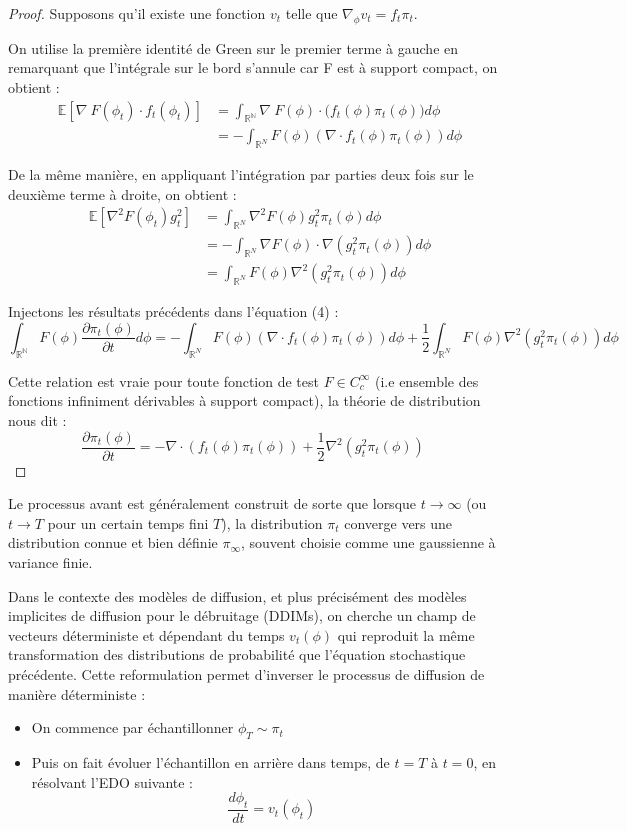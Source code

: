\documentclass[a4paper,10pt]{article}
\theoremstyle{definition} %
\theoremstyle{definition} %
\theoremstyle{definition} %
\theoremstyle{definition} %
\newcommand{\E}[1]{\mathbb{E}\left[#1\right]}
\newcommand{\R}{\mathbb{R}}
\begin{document}
\begin{proof}
Supposons qu'il existe une fonction $v_t$ telle que $\nabla_{\phi} v_t = f_t \pi_t$.

On utilise la première identité de Green sur le premier terme à gauche en remarquant que l'intégrale sur le bord s'annule car F est à support compact, on obtient :
\begin{align*}
    \E{\nabla\ F(\phi_t)\cdot f_t(\phi_t)}  &=\int_{\mathbb{R^N}} \nabla\ F(\phi)\cdot \big(f_t(\phi) \pi_t(\phi) \bigr)d\phi \\
    &= - \int_{\mathbb{R}^N}F(\phi) (\nabla \cdot f_t(\phi)\pi_t(\phi))d\phi
\end{align*}

De la même manière, en appliquant l'intégration par parties deux fois sur le deuxième terme à droite, on obtient :
\begin{align*}
    \E{\nabla^2 F(\phi_t) g_t^2} &= \int_{\mathbb{R}^N } \nabla^2 F(\phi) g_t^2 \pi_t(\phi)d\phi\\
    &= -\int_{\R^N}\nabla F(\phi) \cdot\nabla(g_t^2\pi_t(\phi)) d\phi\\
    &= \int_{\mathbb{R}^N } F(\phi) \nabla^2(g_t^2 \pi_t(\phi)) d\phi
\end{align*}

Injectons les résultats précédents dans l'équation (4) :
\[\int_{\mathbb{R^N}}F(\phi)\frac{\partial\pi_t(\phi)}{\partial t} d\phi = - \int_{\mathbb{R}^N}F(\phi) (\nabla \cdot f_t(\phi)\pi_t(\phi))d\phi + \frac{1}{2}\int_{\mathbb{R}^N } F(\phi) \nabla^2(g_t^2 \pi_t(\phi)) d\phi\]

Cette relation est vraie pour toute fonction de test $F \in C_c^{\infty}$ (i.e ensemble des fonctions infiniment dérivables à support compact), la théorie de distribution nous dit : 
\[\frac{\partial\pi_t(\phi)}{\partial t} = -\nabla \cdot (f_t(\phi)\pi_t(\phi)) + \frac{1}{2}\nabla^2(g_t^2 \pi_t(\phi)) \quad \] 
\end{proof}


Le processus avant est généralement construit de sorte que lorsque $t \rightarrow \infty$ (ou $t \rightarrow T$ pour un certain temps fini $T$), la distribution $\pi_t$ converge vers une distribution connue et bien définie $\pi_{\infty}$, souvent choisie comme une gaussienne à variance finie.

Dans le contexte des modèles de diffusion, et plus précisément des modèles implicites de diffusion pour le débruitage (DDIMs), on cherche un champ de vecteurs déterministe et dépendant du temps $v_t(\phi)$ qui reproduit la même transformation des distributions de probabilité que l'équation stochastique précédente. Cette reformulation permet d'inverser le processus de diffusion de manière déterministe :
\begin{itemize}
    \item On commence par échantillonner $\phi_T \sim \pi_t$
    \item Puis on fait évoluer l'échantillon en arrière dans temps, de $t=T$ à $t = 0$, en résolvant l'EDO suivante :
    \begin{equation}
        \frac{d\phi_t}{dt} = v_t(\phi_t)
    \end{equation}
\end{itemize}
\end{document}
